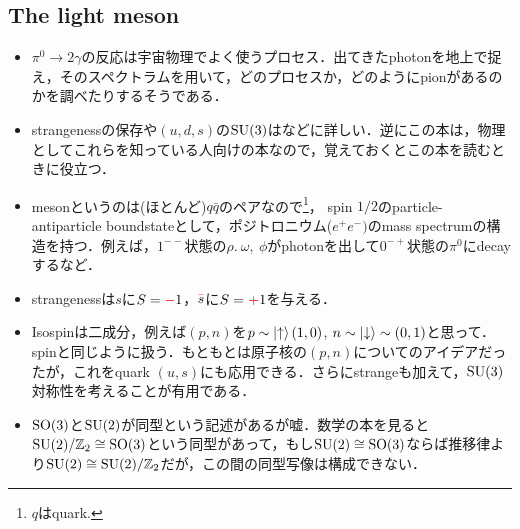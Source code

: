 \subsection{The light meson}
\begin{itemize}
		\item $\pi^0 \to 2\gamma $の反応は宇宙物理でよく使うプロセス．出てきたphotonを地上で捉え，そのスペクトラムを用いて，どのプロセスか，どのようにpionがあるのかを調べたりするそうである．
		\item strangenessの保存や$(u, d, s) $の$\mathrm{SU}(3) $は\cite{BB03663366}などに詳しい．逆にこの本は，物理としてこれらを知っている人向けの本なので，覚えておくとこの本を読むときに役立つ．
		\item mesonというのは(ほとんど)$q\bar{q} $のペアなので\footnote{$q $はquark.}，
				spin $1/2 $のparticle-antiparticle boundstateとして，ポジトロニウム($e^{+}e^{-})$のmass spectrumの構造を持つ．例えば，$1^{--} $状態の$\rho.\ \omega,\ \phi $がphotonを出して$0^{-+} $状態の$\pi^{0} $にdecayするなど．
		\item strangenessは$s $に$S=\color{red}{-}\color{black}{1}  $，$\textcolor{red}{\bar{\color{black}{s}}} $に$S = \color{red}{+}\color{black}{1} $を与える．
		\item Isospinは二成分，例えば$(p, n) $を$p \sim \ket{\uparrow}(1, 0) $, $n\sim \ket{\downarrow} \sim (0, 1)$と思って．spinと同じように扱う．もともとは原子核の$(p, n) $についてのアイデアだったが，これをquark $(u, s) $にも応用できる．さらにstrangeも加えて，$\mathrm{SU}(3) $対称性を考えることが有用である．
		\item $\mathrm{SO}(3) $と$\mathrm{SU}(2) $が同型という記述があるが嘘．数学の本を見ると$\mathrm{SU}(2)/\mathbb{Z}_2 \cong \mathrm{SO}(3)$という同型があって，もし$\mathrm{SU}(2) \cong \mathrm{SO}(3) $ならば推移律より$\mathrm{SU}(2) \cong\mathrm{SU}(2)/\mathbb{Z}_2 $だが，この間の同型写像は構成できない．


\end{itemize}
